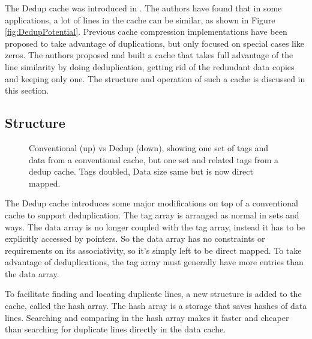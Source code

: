 The Dedup cache was introduced in \cite{dedup}. The authors have found that in some applications, a lot of lines in the cache can be similar, as shown in Figure \ref{fig:DedupPotential}. Previous cache compression implementations have been proposed to take advantage of duplications, but only focused on special cases like zeros\cite{alameldeen2004adaptive, dusser2009zero}. The authors proposed and built a cache that takes full advantage of the line similarity by doing deduplication, getting rid of the redundant data copies and keeping only one. The structure and operation of such a cache is discussed in this section.
\subsection{Structure}
\label{ssec:DedupStructure}
\begin{figure}
    \caption[Dedup Cache]{Conventional (up) vs Dedup (down), showing one set of tags and data from a conventional cache, but one set and related tags from a dedup cache. Tags doubled, Data size same but is now direct mapped.}
    \label{fig:Dedup}
\end{figure}
The Dedup cache introduces some major modifications on top of a conventional cache to support deduplication. The tag array is arranged as normal in sets and ways. The data array is no longer coupled with the tag array, instead it has to be explicitly accessed by pointers. So the data array has no constraints or requirements on its associativity, so it's simply left to be direct mapped. To take advantage of deduplications, the tag array must generally have more entries than the data array.\par
To facilitate finding and locating duplicate lines, a new structure is added to the cache, called the hash array. The hash array is a storage that saves hashes of data lines. Searching and comparing in the hash array makes it faster and cheaper than searching for duplicate lines directly in the data cache.

